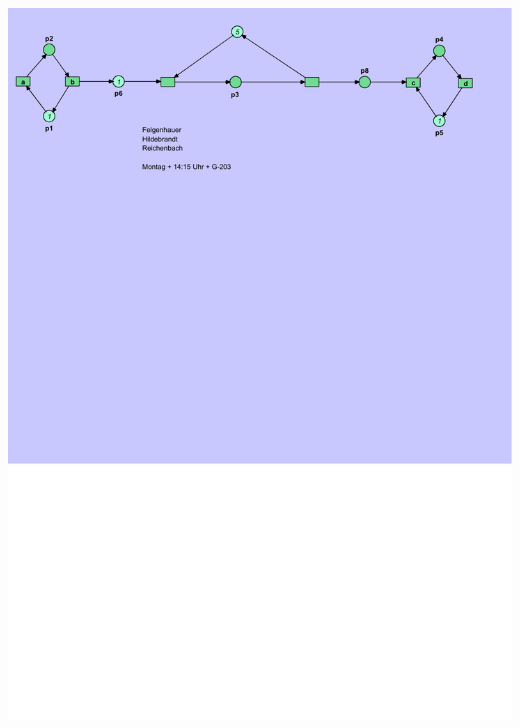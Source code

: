 \documentclass[12pt,a4paper]{../krautsourcing/homework}
\begin{document}
\includegraphics[scale=0.8,trim={0mm 225mm 10mm 0cm},clip]{Aufgabe_6-4/Aufgabe_6-4-7-sim-3.pdf}
\end{document}

